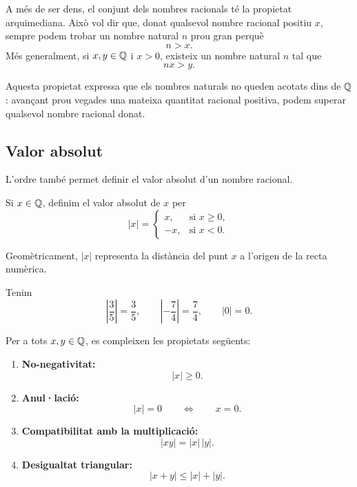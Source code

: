 \begin{observacio}
A més de ser dens, el conjunt dels nombres racionals té la propietat arquimediana. Això vol dir que, donat qualsevol nombre racional positiu \(x\), sempre podem trobar un nombre natural \(n\) prou gran perquè
\[
	n>x.
\]
Més generalment, si \(x,y\in\mathbb{Q}\) i \(x>0\), existeix un nombre natural \(n\) tal que
\[
	nx>y.
\]

Aquesta propietat expressa que els nombres naturals no queden acotats dins de \(\mathbb{Q}\): avançant prou vegades una mateixa quantitat racional positiva, podem superar qualsevol nombre racional donat.
\end{observacio}

\subsection{Valor absolut}

L'ordre també permet definir el valor absolut d'un nombre racional.

\begin{definicio}
Si \(x\in\mathbb{Q}\), definim el valor absolut de \(x\) per
\[
	|x|=
	\begin{cases}
		x, & \text{si } x\geq0,\\
		-x, & \text{si } x<0.
	\end{cases}
\]
\end{definicio}

Geomètricament, \(|x|\) representa la distància del punt \(x\) a l'origen de la recta numèrica.

\begin{exemple}
Tenim
\[
	\left|\frac{3}{5}\right|=\frac{3}{5},
	\qquad
	\left|-\frac{7}{4}\right|=\frac{7}{4},
	\qquad
	|0|=0.
\]
\end{exemple}

\begin{proposicio}
Per a tots \(x,y\in\mathbb{Q}\), es compleixen les propietats següents:
\begin{enumerate}
	\item \textbf{No-negativitat:}
	\[
		|x|\geq0.
	\]

	\item \textbf{Anul·lació:}
	\[
		|x|=0
		\qquad\Longleftrightarrow\qquad
		x=0.
	\]

	\item \textbf{Compatibilitat amb la multiplicació:}
	\[
		|xy|=|x|\,|y|.
	\]

	\item \textbf{Desigualtat triangular:}
	\[
		|x+y|\leq |x|+|y|.
	\]
\end{enumerate}
\end{proposicio}

